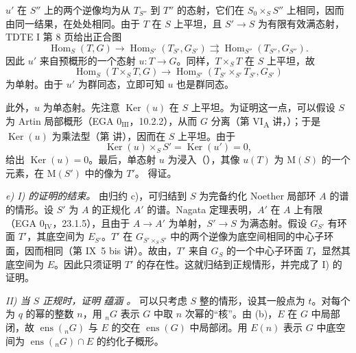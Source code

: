 \(u'\) 在 \(S''\) 上的两个逆像均为从 \(T_{S''}\) 到 \(T''\) 的态射，它们在 \(S_0\times_S S''\) 上相同，因而由同一结果，在处处相同。由于 \(T\) 在 \(S\) 上平坦，且 \(S'\to S\) 为有限有效满态射，TDTE I 第 8 页给出正合图
\[
  \operatorname{Hom}_S(T,G)\longrightarrow
  \operatorname{Hom}_{S'}(T_{S'},G_{S'})
  \rightrightarrows
  \operatorname{Hom}_{S''}(T_{S''},G_{S''}).
\]
因此 \(u'\) 来自预概形的一个态射 \(u:T\to G\)。同样，\(T\times_S T\) 在 \(S\) 上平坦，故
\[
  \operatorname{Hom}_S(T\times_S T,G)\longrightarrow
  \operatorname{Hom}_{S'}(T_{S'}\times_{S'}T_{S'},G_{S'})
\]
为单射。由于 \(u'\) 为群同态，立即可知 \(u\) 也是群同态。

此外，\(u\) 为单态射。先注意 \(\operatorname{Ker}(u)\) 在 \(S\) 上平坦。为证明这一点，可以假设 \(S\) 为 Artin 局部概形（EGA \(0_{\mathrm{III}}\)，10.2.2），从而 \(G\) 分离（第 VI\textsubscript{A} 讲，）；于是 \(\operatorname{Ker}(u)\) 为乘法型（第  讲），因而在 \(S\) 上平坦。由于
\[
  \operatorname{Ker}(u)\times_S S'
    =\operatorname{Ker}(u')=0,
\]
 给出 \(\operatorname{Ker}(u)=0\)。最后，单态射 \(u\) 为浸入（），其像 \(u(T)\) 为 \(\mathrm M(S)\) 的一个元素，在 \(\mathrm M(S')\) 中的像为 \(T'\)。 得证。

\smallskip
\noindent\textit{e) I) 的证明的结束。}\quad
由归约 c)，可归结到 \(S\) 为完备约化 Noether 局部环 \(A\) 的谱的情形。设 \(S'\) 为 \(A\) 的正规化 \(A'\) 的谱。Nagata 定理表明，\(A'\) 在 \(A\) 上有限（EGA \(0_{\mathrm{IV}}\)，23.1.5），且由于 \(A\to A'\) 为单射，\(S'\to S\) 为满态射。假设 \(G_{S'}\) 有环面 \(T'\)，其底空间为 \(E_{S'}\)。\(T'\) 在 \(G_{S'\times_S S'}\) 中的两个逆像为底空间相同的中心子环面，因而相同（第 IX~5 bis 讲）。故由，\(T'\) 来自 \(G_S\) 的一个中心子环面 \(T\)，显然其底空间为 \(E\)。因此只须证明 \(T'\) 的存在性。这就归结到正规情形，并完成了 I) 的证明。

\medskip
\noindent\textit{II) 当 \(S\) 正规时，证明 \textup{} 蕴涵 \textup{}。}\quad
可以只考虑 \(S\) 整的情形，设其一般点为 \(t\)。对每个为 \(q\) 的幂的整数 \(n\)，用 \({}_nG\) 表示 \(G\) 中取 \(n\) 次幂的“核”。由 (b)，\(E\) 在 \(G\) 中局部闭，故 \(\operatorname{ens}({}_nG)\) 与 \(E\) 的交在 \(\operatorname{ens}(G)\) 中局部闭。用 \(E(n)\) 表示 \(G\) 中底空间为 \(\operatorname{ens}({}_nG)\cap E\) 的约化子概形。

